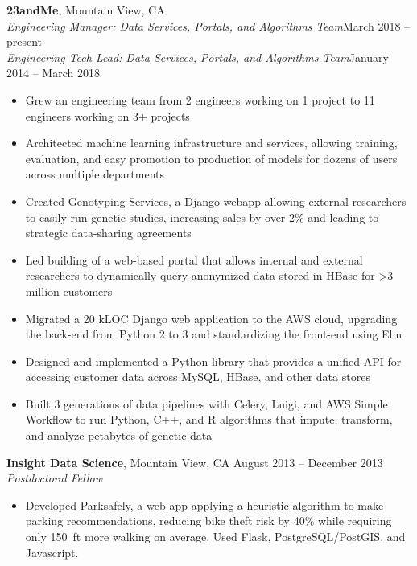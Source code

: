 \documentclass[margin,line]{resume}
\begin{document}
\begin{resume}
    \textbf{23andMe}, Mountain View, CA \hfill\vspace{1mm}\\\vspace{1mm}%
    \textsl{Engineering Manager: Data Services, Portals, and Algorithms Team}\hfill March 2018 -- present\vspace{1mm}\\\vspace{-3mm}%
    \textsl{Engineering Tech Lead: Data Services, Portals, and Algorithms Team}\hfill January 2014 -- March 2018\\%
    \begin{itemize}
    \item Grew an engineering team from 2 engineers working on 1 project to 11 engineers working on 3+ projects
    \item Architected machine learning infrastructure and services, allowing training, evaluation, and easy promotion to production of models for dozens of users across multiple departments
    \item Created Genotyping Services, a Django webapp allowing external researchers to easily run genetic studies, increasing sales by over 2\% and leading to strategic data-sharing agreements
    \item Led building of a web-based portal that allows internal and external researchers to dynamically query anonymized data stored in HBase for \textgreater 3 million customers
    \item Migrated a 20 kLOC Django web application to the AWS cloud, upgrading the back-end from Python 2 to 3 and standardizing the front-end using Elm
    \item Designed and implemented a Python library that provides a unified API for accessing customer data across MySQL, HBase, and other data stores
    \item Built 3 generations of data pipelines with Celery, Luigi, and AWS Simple Workflow to run Python, C++, and R algorithms that impute, transform, and analyze petabytes of genetic data
    \end{itemize}
    
    \textbf{Insight Data Science}, Mountain View, CA \hfill August 2013 -- December 2013\vspace{1mm}\\\vspace{1mm}%
    \textsl{Postdoctoral Fellow}
    \begin{itemize}
    \item Developed Parksafely, a web app applying a heuristic algorithm to make parking recommendations, reducing bike theft risk by 40\% while requiring only 150~ft more walking on average. Used Flask, PostgreSQL/PostGIS, and Javascript.
    \end{itemize}


\end{resume}
\end{document}

